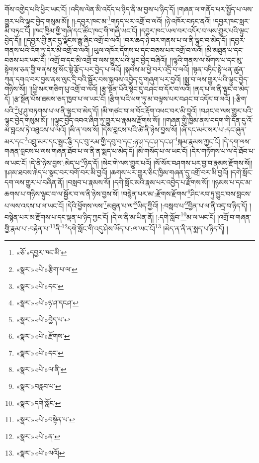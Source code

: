 གོས་འགྱེད་པའི་ཕྱིར་ཡང་ངོ། །འདིས་ལེན་མི་འདོད་པ་ཉིད་ནི་མ་བྱས་པ་ཉིད་དོ། །གཞན་ལ་གནོད་པར་སྤྱོད་པ་ལས་གྱུར་པའི་ལྟུང་བྱེད་གསུམ་མོ།། །།:དབྱར་ཁང་མ་\footnote{«ཅོ་»དབྱར་ཁང་མི་}གཏད་པར་འགྲོ་བ་ལའོ། །ཉེ་འཁོར་བཏང་ནའོ། །དབྱར་ཁང་སླར་མི་བཏང་ངོ། །ཁང་ཁྱིམ་གྱི་གཞི་དང་ཚོང་ཁང་གི་གཞི་ཡང་ངོ། །དབྱར་ཁང་ཡལ་བར་འདོར་བ་ལས་གྱུར་པའི་ལྟུང་བྱེད་དོ།། །།དབྱར་གྱི་ནང་དུ་ལྗོངས་རྒྱུ་ཞིང་འགྲོ་བ་ལའོ། །བར་ཆད་ཉེ་བར་གནས་པ་ལ་ནི་ལྟུང་བ་མེད་དོ། །དབྱར་གནས་པའི་འོག་ཏུ་དེར་མི་འགྲོ་བ་ལའོ། །ཡུལ་འཁོར་དོགས་པ་དང་བཅས་པར་འགྲོ་བ་ལའོ། །མི་མཐུན་པ་དང་བཅས་པར་ཡང་ངོ། །འགྲོ་བ་དང་མི་འགྲོ་བ་ལས་གྱུར་པའི་ལྟུང་བྱེད་བཞིའོ།། །།ལྷའི་གནས་ལ་སོགས་པ་དང་མུ་སྟེགས་ཅན་གྱི་གནས་སུ་སོང་སྟེ་རྩོད་པར་བྱེད་པ་ལའོ། །སྐབས་མ་ཕྱེ་བར་འདྲི་བ་ལའོ། །སྟན་བཏིང་སྟེ་ཕན་ཚུན་ཀུན་དགའ་བར་བྱས་ནས་ལུང་དྲི་བའི་སྦྱོར་བས་སྐབས་འབྱེད་དུ་གཞུག་པར་བྱའོ། །སྨྲ་བ་ལས་གྱུར་པའི་ལྟུང་བྱེད་གཉིས་སོ།། །།ཕྱི་སར་གཅིག་པུ་འགྲོ་བ་ལའོ། །རྩྭ་སྔོན་པོའི་སྟེང་དུ་བཤང་བ་དོར་བ་ལའོ། །ནད་པ་ལ་ནི་ལྟུང་བ་མེད་དོ། །རྩ་སྔོན་པོས་ཐམས་ཅད་ཁྱབ་པ་ལ་ཡང་ངོ། །རྩིག་པའི་ཕག་ཏུ་མ་བལྟས་པར་བཤང་བ་འདོར་བ་ལའོ། །:རྩིག་པའི་\footnote{«སྣར་»«པེ་»རྩིག་པ་ལ་}པུ་ཤུ་བཏགས་པ་ལ་ནི་ལྟུང་བ་མེད་དོ། །མི་གཙང་བ་ལ་བོང་རྡོག་འཕང་བར་མི་བྱའོ། །བཤང་བ་ལས་གྱུར་པའི་ལྟུང་བྱེད་གསུམ་མོ།། །།ལྟུང་བྱེད་འབའ་ཞིག་ཏུ་གྱུར་པ་རྣམས་རྫོགས་སོ།། །།གཞན་གྱི་ཁྱིམ་ནས་བདག་གི་དོན་དུ་འོ་མ་བླངས་ཏེ་འཐུངས་པ་ལའོ། །མི་ན་བས་སོ། །དེས་བླངས་པའི་ཚེ་ནི་ཉེས་བྱས་སོ། །ཞོ་དང་མར་སར་པ་:དང་ཞུན་མར་དང་\footnote{«སྣར་»«པེ་»དང་}འབྲུ་མར་དང་སྦྲང་རྩི་དང་བུ་རམ་གྱི་དབུ་བ་དང་:ཉ་ཤ་དང་ཤ་དང་ཤ་\footnote{«སྣར་»«པེ་»ཉ་ཤ་དངཤ་}སྐམ་རྣམས་ཀྱང་ངོ། །དེ་དག་ལས་གཞན་བླངས་པ་ལས་གཞན་ཐོབ་པ་ལ་ནི་ན་སྨད་པ་མེད་དོ། །མི་གསོད་པ་ལ་ཡང་ངོ། །དེར་གཏོགས་པ་ལ་དེ་ཐོབ་པ་ལ་ཡང་ངོ། །དེ་ནི་ཉེས་བྱས་:མེད་པ་\footnote{«སྣར་»«པེ་»བྱེད་པ་}ཉིད་དོ། །སེང་གེ་ལས་གྱུར་པའོ། །སོ་སོར་བཤགས་པར་བྱ་བ་རྣམས་རྫོགས་སོ།། །།ཤམ་ཐབས་རྐེད་པ་སྣང་བར་བགོ་བར་མི་བྱའོ། །ཆགས་པར་གྱུར་ཅིང་ཁྱིམ་གཞན་དུ་འགྲོ་བར་མི་བྱའོ། །དགེ་སློང་དག་ལས་གྱུར་པ་བཞིན་ནོ། །བསླབ་པ་རྣམས་སོ། །དགེ་སློང་མའི་རྣམ་པར་འབྱེད་པ་རྫོགས་སོ།། །།ཉམས་པ་དང་མ་ཆགས་པ་གཉིས་ལྟུང་བ་ལ་སྦྱོར་བ་ལ་ནི་ཉེས་བྱས་སོ། །བསྙེན་པར་མ་:རྫོགས་རྫོགས་\footnote{«སྣར་»«པེ་»རྫོགས་}ཤིང་རབ་ཏུ་བྱུང་བས་བླངས་པ་ལས་འདས་པ་ལ་ཡང་ངོ། །དེའི་ཕྱོགས་ལས་\footnote{«སྣར་»«པེ་»དང་}མཐུན་པ་ལ་\footnote{«སྣར་»«པེ་»ལ་ནི་}ཡིད་ཀྱིའོ། །:བསླབ་པ་\footnote{«སྣར་»བརླབ་པ་}བྱིན་པ་ལ་ནི་འདྲ་བ་ཉིད་དོ། །བསྙེན་པར་མ་རྫོགས་པ་དང་ལྡན་པ་ཉིད་ཀྱང་ངོ། །དེ་ལ་ནི་མ་ཡིན་ནོ། །:དགེ་སློབ་\footnote{«སྣར་»དགེ་སློང་}མ་ལ་ཡང་ངོ། །འགྲོ་བ་གཞན་གྱི་རྣམ་པ་:བརྟེན་པ་\footnote{«སྣར་»«པེ་»བསྟེན་པ་}ནི་\footnote{«སྣར་»«པེ་»ན་}དགེ་སློང་གི་འདུ་ཤེས་ཡོད་པ་:ལ་ཡང་ངོ།\footnote{«སྣར་»«པེ་»ལའོ།} །མེད་ན་ནི་ན་སྨད་པ་ཉིད་དོ། །
